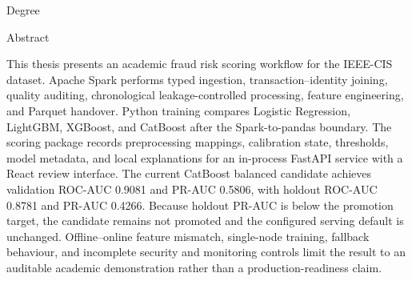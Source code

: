 \begin{center}
{\Large\parbox{0.94\textwidth}{\centering\ThesisTitle}\par}
{\large\GroupName\par}
\vspace{2pt}
{\small\AuthorList\par}
{\large Degree \DegreeName\par}
{\large \InstitutionName\par}
{\large\ConvocationYear\par}
\end{center}

\vspace{0.25in}
\begin{center}
{\Large Abstract\par}
\end{center}

This thesis presents an academic fraud risk scoring workflow for the IEEE-CIS
dataset. Apache Spark performs typed ingestion, transaction--identity joining,
quality auditing, chronological leakage-controlled processing, feature
engineering, and Parquet handover. Python training compares Logistic Regression,
LightGBM, XGBoost, and CatBoost after the Spark-to-pandas boundary. The scoring
package records preprocessing mappings, calibration state, thresholds, model
metadata, and local explanations for an in-process FastAPI service with a React
review interface. The current CatBoost balanced candidate achieves validation
ROC-AUC 0.9081 and PR-AUC 0.5806, with holdout ROC-AUC 0.8781 and PR-AUC 0.4266.
Because holdout PR-AUC is below the promotion target, the candidate remains
not promoted and the configured serving default is unchanged. Offline--online
feature mismatch, single-node training, fallback behaviour, and incomplete
security and monitoring controls limit the result to an auditable academic
demonstration rather than a production-readiness claim.
